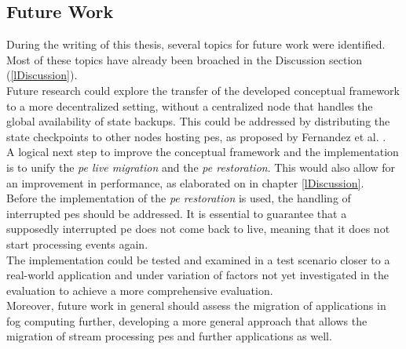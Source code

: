 \subsection{Future Work}
\label{lFutureWork}

During the writing of this thesis, several topics for future work were identified. Most of these topics have already been broached in the Discussion section (\ref{lDiscussion}).\\
Future research could explore the transfer of the developed conceptual framework to a more decentralized setting, without a centralized node that handles the global availability of state backups. This could be addressed by distributing the state checkpoints to other nodes hosting \gls{pe}s, as proposed by Fernandez et al. \cite{CastroFernandez.2013}.\\
A logical next step to improve the conceptual framework and the implementation is to unify the \textit{\acrshort{pe} live migration} and the \textit{\acrshort{pe} restoration}. This would also allow for an improvement in performance, as elaborated on in chapter \ref{lDiscussion}.\\
Before the implementation of the \textit{\acrshort{pe} restoration} is used, the handling of interrupted \gls{pe}s should be addressed. It is essential to guarantee that a supposedly interrupted \gls{pe} does not come back to live, meaning that it does not start processing events again.\\
The implementation could be tested and examined in a test scenario closer to a real-world application and under variation of factors not yet investigated in the evaluation to achieve a more comprehensive evaluation.\\
Moreover, future work in general should assess the migration of applications in fog computing further, developing a more general approach that allows the migration of stream processing \gls{pe}s and further applications as well.